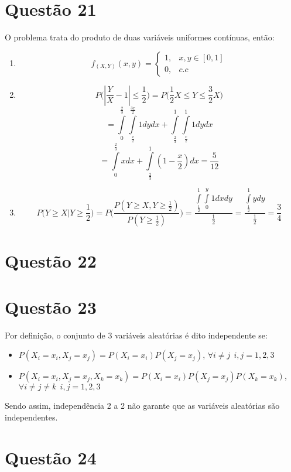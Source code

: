 \documentclass[a4paper,12pt]{report}
\begin{document}
			\section{Questão 21}
			O problema trata do produto de duas variáveis uniformes contínuas, então:
					\begin{enumerate}[label=\alph*)]
						\item 
			$$f_(X,Y)(x,y)=\begin{cases}
			1, & x,y \in [0,1]\\
			0, & c.c
			\end{cases} $$
			\item $$P\bigg(|\frac{Y}{X}-1| \le \frac{1}{2}\bigg)  = 
			P\bigg(\frac{1}{2} X \le Y \le \frac{3}{2} X  \bigg)$$
			$$= \int\limits_{0}^{\frac{2}{3}}\int\limits_{\frac{x}{2}}^{\frac{3x}{2}}1 dydx +   
			\int\limits_{\frac{2}{3}}^{1}\int\limits_{\frac{x}{2}}^{1}1 dydx
			$$
			$$ 
=	\int\limits_{0}^{\frac{2}{3}}x dx +   
	\int\limits_{\frac{2}{3}}^{1}(1-\frac{x}{2}) dx = \frac{5}{12}
			$$
			\item $$P\bigg(Y\ge X| Y \ge \frac{1}{2}\bigg)  = P\bigg(
			\frac{P(Y\ge X, Y\ge \frac{1}{2})}{P(Y\ge \frac{1}{2})}
			\bigg)
			=
			\frac{\int\limits_{\frac{1}{2}}^1\int\limits_0^y 1 dxdy}{\frac{1}{2}} = 
				\frac{\int\limits_{\frac{1}{2}}^1 y dy}{\frac{1}{2}} = \frac{3}{4}
			$$
			\end{enumerate}
	 		\section{Questão 22}

	\section{Questão 23}
	
	Por definição, o conjunto de 3 variáveis aleatórias é dito independente se:
	
	\begin{itemize}
		 \item $P(X_i=x_i,X_j=x_j) = P(X_i=x_i)P(X_j=x_j)$, $\forall i\ne j  \ \ i,j=1,2,3$	
		 		 \item $P(X_i=x_i,X_j=x_j,X_k=x_k) = P(X_i=x_i)P(X_j=x_j)P(X_k=x_k)$, $\forall i\ne j \ne k\ \ i,j=1,2,3$	
	
	\end{itemize} 
Sendo assim, independência 2 a 2 não garante que as variáveis aleatórias são independentes.
\newpage 
	\section{Questão 24}
	
\end{document}
